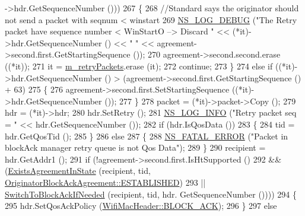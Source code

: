 \begin{DoxyCode}
      ->hdr.GetSequenceNumber ()))
267             \{
268               \textcolor{comment}{//Standard says the originator should not send a packet with seqnum < winstart}
269               \hyperlink{group__logging_ga413f1886406d49f59a6a0a89b77b4d0a}{NS\_LOG\_DEBUG} (\textcolor{stringliteral}{"The Retry packet have sequence number < WinStartO --> Discard "} <<
       (*it)->hdr.GetSequenceNumber () << \textcolor{stringliteral}{" "} << agreement->second.first.GetStartingSequence ());
270               agreement->second.second.erase ((*it));
271               it = \hyperlink{classns3_1_1BlockAckManager_a2851f947dd68945ebc25961cff893ed9}{m\_retryPackets}.erase (it);
272               \textcolor{keywordflow}{continue};
273             \}
274           \textcolor{keywordflow}{else} \textcolor{keywordflow}{if} ((*it)->hdr.GetSequenceNumber () > (agreement->second.first.GetStartingSequence () + 63) 
275             \{
276               agreement->second.first.SetStartingSequence ((*it)->hdr.GetSequenceNumber ());
277             \}
278           packet = (*it)->packet->Copy ();
279           hdr = (*it)->hdr;
280           hdr.SetRetry ();
281           \hyperlink{group__logging_gafbd73ee2cf9f26b319f49086d8e860fb}{NS\_LOG\_INFO} (\textcolor{stringliteral}{"Retry packet seq = "} << hdr.GetSequenceNumber ());
282           \textcolor{keywordflow}{if} (hdr.IsQosData ())
283             \{
284               tid = hdr.GetQosTid ();
285             \}
286           \textcolor{keywordflow}{else}
287             \{
288               \hyperlink{group__fatal_ga5131d5e3f75d7d4cbfd706ac456fdc85}{NS\_FATAL\_ERROR} (\textcolor{stringliteral}{"Packet in blockAck manager retry queue is not Qos Data"});
289             \}
290           recipient = hdr.GetAddr1 ();
291           \textcolor{keywordflow}{if} (!agreement->second.first.IsHtSupported ()
292               && (\hyperlink{classns3_1_1BlockAckManager_ae13c4678f75ebfda7f63d0521878662b}{ExistsAgreementInState} (recipient, tid, 
      \hyperlink{classns3_1_1OriginatorBlockAckAgreement_ab33ae8af8c458aca7437a472778e4761a341f78e1e094b88dea42e94b32871067}{OriginatorBlockAckAgreement::ESTABLISHED})
293                   || \hyperlink{classns3_1_1BlockAckManager_a20324b49d01312f731087f7f707a596a}{SwitchToBlockAckIfNeeded} (recipient, tid, hdr.
      GetSequenceNumber ())))
294             \{
295               hdr.SetQosAckPolicy (\hyperlink{classns3_1_1WifiMacHeader_ae3a382482f357972019f5e1b3162adc4a8d2763ea0083f1265fbf7dda6fdcf9fd}{WifiMacHeader::BLOCK\_ACK});
296             \}
297           \textcolor{keywordflow}{else}

\end{DoxyCode}

